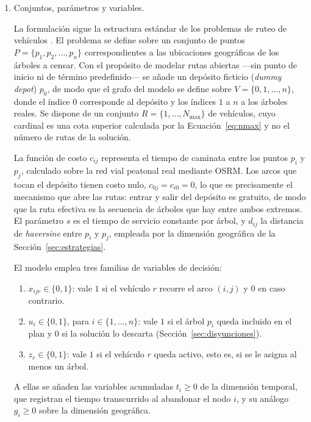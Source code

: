 \begin{enumerate}
\item Conjuntos, parámetros y variables.

La formulación sigue la estructura estándar de los problemas de ruteo de vehículos
\citep{toth2014vehicle}. El problema se define sobre un conjunto de puntos $P = \{p_1, p_2, \ldots,
p_n\}$ correspondientes a las ubicaciones geográficas de los árboles a censar. Con el propósito de
modelar rutas abiertas ---sin punto de inicio ni de término predefinido---
\citep{li2007open} se añade un depósito ficticio
(\textit{dummy depot}) $p_0$, de modo que el grafo del modelo se define sobre $V = \{0, 1, \ldots,
n\}$, donde el índice $0$ corresponde al depósito y los índices $1$ a $n$ a los árboles reales. Se
dispone de un conjunto $R = \{1, \ldots, N_{\max}\}$ de vehículos, cuyo cardinal es una cota
superior calculada por la Ecuación~\ref{eq:nmax} y no el número de rutas de la solución.

La función de costo $c_{ij}$ representa el tiempo de caminata entre los puntos $p_i$ y $p_j$,
calculado sobre la red vial peatonal real mediante OSRM. Los arcos que tocan el depósito tienen
costo nulo, $c_{0j} = c_{i0} = 0$, lo que es precisamente el mecanismo que abre las rutas: entrar y
salir del depósito es gratuito, de modo que la ruta efectiva es la secuencia de árboles que hay
entre ambos extremos. El parámetro $s$ es el tiempo de servicio constante por árbol, y $d_{ij}$ la
distancia de \textit{haversine} \citep{sinnott1984virtues} entre $p_i$ y $p_j$, empleada por la
dimensión geográfica de la
Sección~\ref{sec:estrategias}.

El modelo emplea tres familias de variables de decisión:

\begin{enumerate}
  \item $x_{ijr} \in \{0,1\}$: vale $1$ si el vehículo $r$ recorre el arco
        $(i,j)$ y $0$ en caso contrario.
  \item $u_i \in \{0,1\}$, para $i \in \{1,\ldots,n\}$: vale $1$ si el árbol $p_i$
        queda incluido en el plan y $0$ si la solución lo descarta
        (Sección~\ref{sec:disyunciones}).
  \item $z_r \in \{0,1\}$: vale $1$ si el vehículo $r$ queda activo, esto es, si
        se le asigna al menos un árbol.
\end{enumerate}

A ellas se añaden las variables acumuladas $t_i \geq 0$ de la dimensión temporal, que registran el
tiempo transcurrido al abandonar el nodo $i$, y su análogo $g_i \geq 0$ sobre la dimensión
geográfica.


\end{enumerate}
